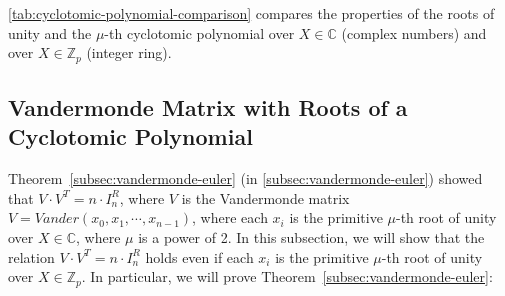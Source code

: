 \autoref{tab:cyclotomic-polynomial-comparison} compares the properties of the roots of unity and the $\mu$-th cyclotomic polynomial over $X \in \mathbb{C}$ (complex numbers) and over $X \in \mathbb{Z}_p$ (integer ring).






\subsection{Vandermonde Matrix with Roots of a Cyclotomic Polynomial}
\label{subsec:vandermonde-euler-integer-ring}

Theorem~\ref*{subsec:vandermonde-euler} (in \autoref{subsec:vandermonde-euler}) showed that $V \cdot V^T = n \cdot I^R_n$, where $V$ is the Vandermonde matrix $V = \mathit{Vander}(x_0, x_1, \cdots, x_{n-1})$, where each $x_i$ is the primitive $\mu$-th root of unity over $X \in \mathbb{C}$, where $\mu$ is a power of 2. In this subsection, we will show that the relation $V \cdot V^T = n \cdot I^R_n$ holds even if each $x_i$ is the primitive $\mu$-th root of unity over $X \in \mathbb{Z}_p$. In particular, we will prove Theorem~\ref*{subsec:vandermonde-euler}: 


